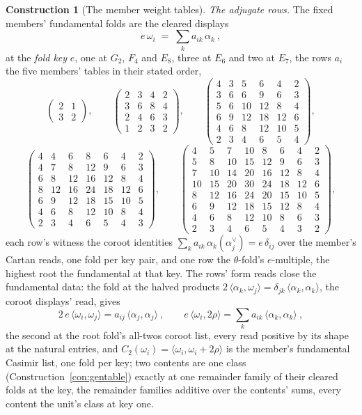 \documentclass[11pt]{article}
\theoremstyle{definition}
\newtheorem{construction}{Construction}
\begin{document}
\begin{construction}[The member weight tables]
\emph{The adjugate rows.} The fixed members' fundamental folds
are the cleared displays
\[
e\,\omega_i\;=\;\sum_k a_{ik}\,\alpha_k\ ,
\]
at the \emph{fold key} $e$, one at $G_2$, $F_4$ and $E_8$, three
at $E_6$ and two at $E_7$, the rows $a_i$ the five members'
tables in their stated order,
\[
\begin{pmatrix}2&1\\3&2\end{pmatrix},\qquad
\begin{pmatrix}2&3&4&2\\3&6&8&4\\2&4&6&3\\1&2&3&2\end{pmatrix},\qquad
\begin{pmatrix}4&3&5&6&4&2\\3&6&6&9&6&3\\5&6&10&12&8&4\\
6&9&12&18&12&6\\4&6&8&12&10&5\\2&3&4&6&5&4\end{pmatrix},
\]
\[
\begin{pmatrix}4&4&6&8&6&4&2\\4&7&8&12&9&6&3\\6&8&12&16&12&8&4\\
8&12&16&24&18&12&6\\6&9&12&18&15&10&5\\4&6&8&12&10&8&4\\
2&3&4&6&5&4&3\end{pmatrix},\qquad
\begin{pmatrix}4&5&7&10&8&6&4&2\\5&8&10&15&12&9&6&3\\
7&10&14&20&16&12&8&4\\10&15&20&30&24&18&12&6\\
8&12&16&24&20&15&10&5\\6&9&12&18&15&12&8&4\\
4&6&8&12&10&8&6&3\\2&3&4&6&5&4&3&2\end{pmatrix},
\]
each row's witness the coroot identities
$\sum_k a_{ik}\,\alpha_k(\alpha_j^\vee)=e\,\delta_{ij}$ over the
member's Cartan reads, one fold per key pair, and one row the
$\theta$-fold's $e$-multiple, the highest root the fundamental
at that key. The rows' form reads close the fundamental data:
the fold at the halved products
$2\,\langle\alpha_k,\omega_j\rangle
=\delta_{jk}\,\langle\alpha_k,\alpha_k\rangle$, the coroot
displays' read, gives
\[
2\,e\,\langle\omega_i,\omega_j\rangle
=a_{ij}\,\langle\alpha_j,\alpha_j\rangle\ ,
\qquad
e\,\langle\omega_i,2\rho\rangle
=\sum_k a_{ik}\,\langle\alpha_k,\alpha_k\rangle\ ,
\]
the second at the root fold's all-twos coroot list, every read
positive by its shape at the natural entries, and
$C_2(\omega_i)=\langle\omega_i,\omega_i+2\rho\rangle$ is the
member's fundamental Casimir list, one fold per key; two
contents are one class (Construction~\ref{con:gentable})
exactly at one remainder family of their cleared folds at the
key, the remainder families additive over the contents' sums,
every content the unit's class at key one.


\end{construction}
\end{document}
